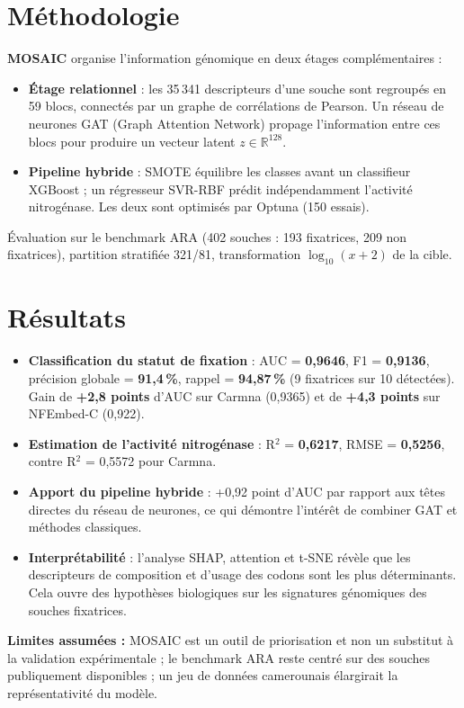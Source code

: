 \documentclass[14pt,a4paper]{extarticle}
\begin{document}
\section*{Méthodologie}
\textbf{MOSAIC} organise l'information génomique en deux étages complémentaires :
\begin{itemize}
    \item \textbf{Étage relationnel} : les 35\,341 descripteurs d'une souche sont regroupés en 59 blocs, connectés par un graphe de corrélations de Pearson. Un réseau de neurones GAT (Graph Attention Network) propage l'information entre ces blocs pour produire un vecteur latent $z \in \mathbb{R}^{128}$.
    \item \textbf{Pipeline hybride} : SMOTE équilibre les classes avant un classifieur XGBoost ; un régresseur SVR-RBF prédit indépendamment l'activité nitrogénase. Les deux sont optimisés par Optuna (150 essais).
\end{itemize}
Évaluation sur le benchmark ARA (402 souches : 193 fixatrices, 209 non fixatrices), partition stratifiée 321/81, transformation $\log_{10}(x+2)$ de la cible.

\section*{Résultats}
\begin{itemize}
    \item \textbf{Classification du statut de fixation} : AUC = \textbf{0,9646}, F1 = \textbf{0,9136}, précision globale = \textbf{91,4\,\%}, rappel = \textbf{94,87\,\%} (9 fixatrices sur 10 détectées). Gain de \textbf{+2,8 points} d'AUC sur Carmna (0,9365) et de \textbf{+4,3 points} sur NFEmbed-C (0,922).
    \item \textbf{Estimation de l'activité nitrogénase} : R$^2$ = \textbf{0,6217}, RMSE = \textbf{0,5256}, contre R$^2$ = 0,5572 pour Carmna.
    \item \textbf{Apport du pipeline hybride} : +0,92 point d'AUC par rapport aux têtes directes du réseau de neurones, ce qui démontre l'intérêt de combiner GAT et méthodes classiques.
    \item \textbf{Interprétabilité} : l'analyse SHAP, attention et t-SNE révèle que les descripteurs de composition et d'usage des codons sont les plus déterminants. Cela ouvre des hypothèses biologiques sur les signatures génomiques des souches fixatrices.
\end{itemize}

\textbf{Limites assumées :} MOSAIC est un outil de priorisation et non un substitut à la validation expérimentale ; le benchmark ARA reste centré sur des souches publiquement disponibles ; un jeu de données camerounais élargirait la représentativité du modèle.
\end{document}
